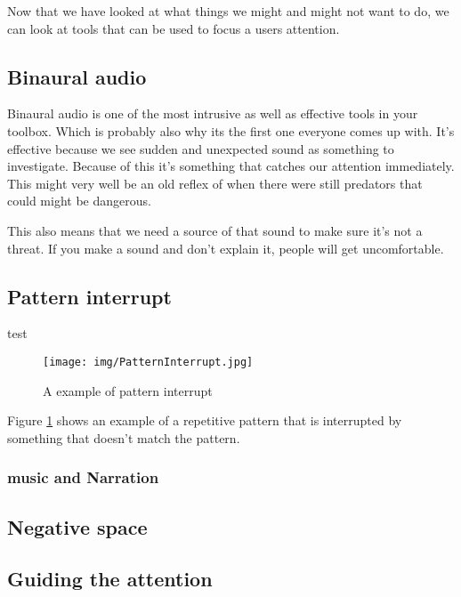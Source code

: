 \documentclass{report}
\begin{document}
				Now that we have looked at what things we might and might not want to do, we can look at tools that can be used to focus a users attention.
				
				\subsection{Binaural audio}
				Binaural audio is one of the most intrusive as well as effective tools in your toolbox. Which is probably also why its the first one everyone comes up with. It's effective because we see sudden and unexpected sound as something to investigate. Because of this it's something that catches our attention immediately.			
				This might very well be an old reflex of when there were still predators that could might be dangerous.  
				
				This also means that we need a source of that sound to make sure it's not a threat. If you make a sound and don't explain it, people will get uncomfortable. 
				
				\subsection{Pattern interrupt}
				test
				\begin{figure}
 					\texttt{[image: img/PatternInterrupt.jpg]}
					\caption{A example of pattern interrupt}
					\label{fig:PatternInterrupt1}
				\end{figure}
				
				Figure \ref{fig:PatternInterrupt1} shows an example of a repetitive pattern that is interrupted by something that doesn't match the pattern.
				
				\subsubsection{music and Narration}
				
				
				
				\subsection{Negative space}
				\subsection{Guiding the attention}
				
\end{document}
